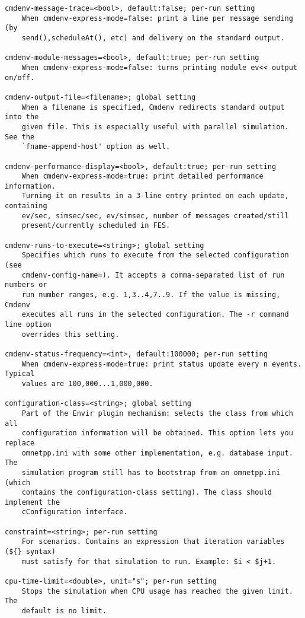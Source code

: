 \begin{verbatim}
cmdenv-message-trace=<bool>, default:false; per-run setting
    When cmdenv-express-mode=false: print a line per message sending (by
    send(),scheduleAt(), etc) and delivery on the standard output.

cmdenv-module-messages=<bool>, default:true; per-run setting
    When cmdenv-express-mode=false: turns printing module ev<< output on/off.

cmdenv-output-file=<filename>; global setting
    When a filename is specified, Cmdenv redirects standard output into the
    given file. This is especially useful with parallel simulation. See the
    `fname-append-host' option as well.

cmdenv-performance-display=<bool>, default:true; per-run setting
    When cmdenv-express-mode=true: print detailed performance information.
    Turning it on results in a 3-line entry printed on each update, containing
    ev/sec, simsec/sec, ev/simsec, number of messages created/still
    present/currently scheduled in FES.

cmdenv-runs-to-execute=<string>; global setting
    Specifies which runs to execute from the selected configuration (see
    cmdenv-config-name=). It accepts a comma-separated list of run numbers or
    run number ranges, e.g. 1,3..4,7..9. If the value is missing, Cmdenv
    executes all runs in the selected configuration. The -r command line option
    overrides this setting.

cmdenv-status-frequency=<int>, default:100000; per-run setting
    When cmdenv-express-mode=true: print status update every n events. Typical
    values are 100,000...1,000,000.

configuration-class=<string>; global setting
    Part of the Envir plugin mechanism: selects the class from which all
    configuration information will be obtained. This option lets you replace
    omnetpp.ini with some other implementation, e.g. database input. The
    simulation program still has to bootstrap from an omnetpp.ini (which
    contains the configuration-class setting). The class should implement the
    cConfiguration interface.

constraint=<string>; per-run setting
    For scenarios. Contains an expression that iteration variables (${} syntax)
    must satisfy for that simulation to run. Example: $i < $j+1.

cpu-time-limit=<double>, unit="s"; per-run setting
    Stops the simulation when CPU usage has reached the given limit. The
    default is no limit.


\end{verbatim}
